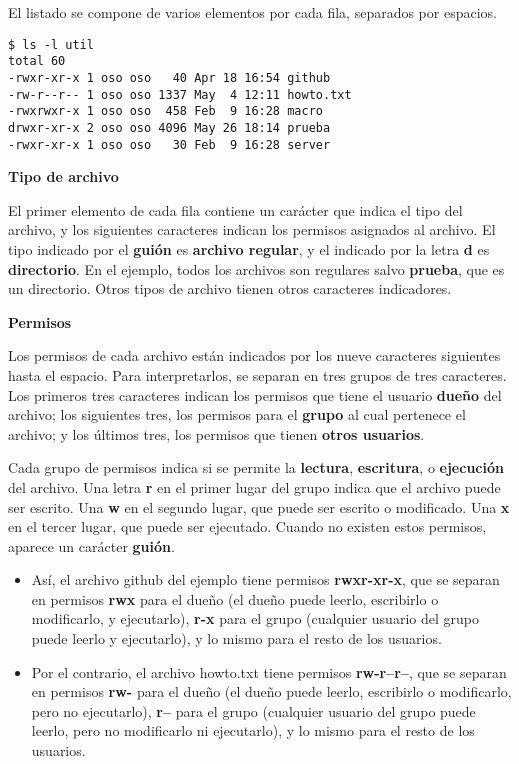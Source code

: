 \documentclass[spanish,a4paper,]{article}
\providecommand{\tightlist}{%
  \setlength{\itemsep}{0pt}\setlength{\parskip}{0pt}}
\begin{document}
El listado se compone de varios elementos por cada fila, separados por
espacios.

\begin{verbatim}
$ ls -l util
total 60
-rwxr-xr-x 1 oso oso   40 Apr 18 16:54 github
-rw-r--r-- 1 oso oso 1337 May  4 12:11 howto.txt
-rwxrwxr-x 1 oso oso  458 Feb  9 16:28 macro
drwxr-xr-x 2 oso oso 4096 May 26 18:14 prueba
-rwxr-xr-x 1 oso oso   30 Feb  9 16:28 server
\end{verbatim}

\textbf{Tipo de archivo}

El primer elemento de cada fila contiene un carácter que indica el tipo
del archivo, y los siguientes caracteres indican los permisos asignados
al archivo. El tipo indicado por el \textbf{guión} es \textbf{archivo
regular}, y el indicado por la letra \textbf{d} es \textbf{directorio}.
En el ejemplo, todos los archivos son regulares salvo \textbf{prueba},
que es un directorio. Otros tipos de archivo tienen otros caracteres
indicadores.

\textbf{Permisos}

Los permisos de cada archivo están indicados por los nueve caracteres
siguientes hasta el espacio. Para interpretarlos, se separan en tres
grupos de tres caracteres. Los primeros tres caracteres indican los
permisos que tiene el usuario \textbf{dueño} del archivo; los siguientes
tres, los permisos para el \textbf{grupo} al cual pertenece el archivo;
y los últimos tres, los permisos que tienen \textbf{otros usuarios}.

Cada grupo de permisos indica si se permite la \textbf{lectura},
\textbf{escritura}, o \textbf{ejecución} del archivo. Una letra
\textbf{r} en el primer lugar del grupo indica que el archivo puede ser
escrito. Una \textbf{w} en el segundo lugar, que puede ser escrito o
modificado. Una \textbf{x} en el tercer lugar, que puede ser ejecutado.
Cuando no existen estos permisos, aparece un carácter \textbf{guión}.

\begin{itemize}
\tightlist
\item
  Así, el archivo github del ejemplo tiene permisos \textbf{rwxr-xr-x},
  que se separan en permisos \textbf{rwx} para el dueño (el dueño puede
  leerlo, escribirlo o modificarlo, y ejecutarlo), \textbf{r-x} para el
  grupo (cualquier usuario del grupo puede leerlo y ejecutarlo), y lo
  mismo para el resto de los usuarios.
\item
  Por el contrario, el archivo howto.txt tiene permisos
  \textbf{rw-r--r--}, que se separan en permisos \textbf{rw-} para el
  dueño (el dueño puede leerlo, escribirlo o modificarlo, pero no
  ejecutarlo), \textbf{r--} para el grupo (cualquier usuario del grupo
  puede leerlo, pero no modificarlo ni ejecutarlo), y lo mismo para el
  resto de los usuarios.
\end{itemize}
\end{document}
